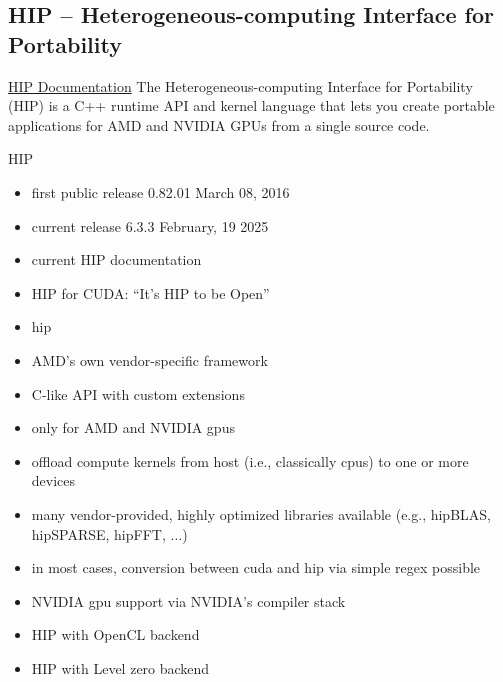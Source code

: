 \newpage
\subsection{HIP -- Heterogeneous-computing Interface for Portability}
\label{sec:frameworks:hip}

\begin{quotebox}{\href{https://rocm.docs.amd.com/projects/HIP/en/latest/index.html\#hip-documentation}{HIP Documentation}}
    The Heterogeneous-computing Interface for Portability (HIP) is a C++ runtime API and kernel language that lets you create portable applications for AMD and NVIDIA GPUs from a single source code.
\end{quotebox}

HIP
\begin{itemize}
    \item first public release 0.82.01 March 08, 2016~\cite{advanced_micro_devices_release_2016}
    \item current release 6.3.3 February, 19 2025~\cite{advanced_micro_devices_release_2025}
    \item current HIP documentation~\cite{advanced_micro_devices_hip_nodate}
    \item HIP for CUDA: \enquote{It’s HIP to be Open}~\cite{advanced_micro_devices_its_2016}
\end{itemize}


\begin{itemize}
    \item \acrfull{hip}
    \item AMD's own vendor-specific framework
    \item C-like API with custom extensions 
    \item only for AMD and NVIDIA \glspl{gpu}
    \item offload compute kernels from host (i.e., classically \glspl{cpu}) to one or more devices
    \item many vendor-provided, highly optimized libraries available (e.g., hipBLAS, hipSPARSE, hipFFT, $\dots$)
    \item in most cases, conversion between \gls{cuda} and \gls{hip} via simple regex possible
    \item NVIDIA \gls{gpu} support via NVIDIA's compiler stack
    \item HIP with OpenCL backend~\cite{babej_hipcl_2020}
    \item HIP with Level zero backend~\cite{singer_hiplz_2023}
\end{itemize}

